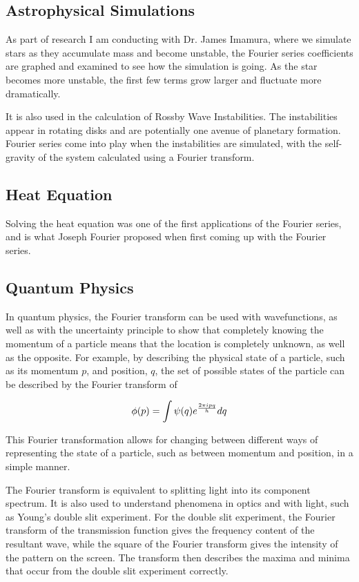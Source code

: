 \documentclass{article}
\begin{document}
\subsection{Astrophysical Simulations}
As part of research I am conducting with Dr. James Imamura, where we simulate stars as they accumulate mass and become unstable, the Fourier series coefficients are graphed and examined to see how the simulation is going. As the star becomes more unstable, the first few terms grow larger and fluctuate more dramatically.

It is also used in the calculation of Rossby Wave Instabilities. The instabilities appear in rotating disks and are potentially one avenue of planetary formation. Fourier series come into play when the instabilities are simulated, with the self-gravity of the system calculated using a Fourier transform.\cite{Lovelace}
\subsection{Heat Equation}
Solving the heat equation was one of the first applications of the Fourier series, and is what Joseph Fourier proposed when first coming up with the Fourier series.\cite{FourierHeatSignal}

\subsection{Quantum Physics}
In quantum physics, the Fourier transform can be used with wavefunctions, as well as with the uncertainty principle to show that completely knowing the momentum of a particle means that the location is completely unknown, as well as the opposite. For example, by describing the physical state of a particle, such as its momentum $p$, and position, $q$, the set of possible states of the particle can be described by the Fourier transform of 

$$\phi(p) = \int \psi (q) e^{2\pi i pq\over h} dq$$

This Fourier transformation allows for changing between different ways of representing the state of a particle, such as between momentum and position, in a simple manner.\cite{WikiTransform}

The Fourier transform is equivalent to splitting light into its component spectrum. It is also used to understand phenomena in optics and with light, such as Young's double slit experiment. For the double slit experiment, the Fourier transform of the transmission function gives the frequency content of the resultant wave, while the square of the Fourier transform gives the intensity of the pattern on the screen. The transform then describes the maxima and minima that occur from the double slit experiment correctly.\cite{Optics}
\end{document}
